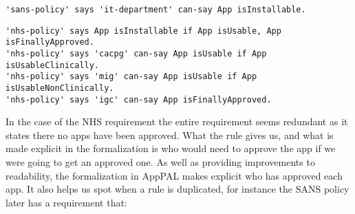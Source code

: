 \documentclass[a4paper]{article}
\newcommand{\dotdotdot}[1]{#1}
\begin{document}
\begin{lstlisting}[title={\footnotesize\textbf{SANS}:~\itshape 
``The IT Department maintains a list of allowed and unauthorised applications and makes them available to users on the intranet.''}]
'sans-policy' says 'it-department' can-say App isInstallable.
\end{lstlisting}
\begin{lstlisting}[title={\footnotesize\textbf{NHS}:~\itshape ``%
Apps for work usage must not be downloaded onto corporately issued mobile devices (even if approved on the NHS apps store) unless they have been approved through the following Trust channels: 
    Clinical apps;
        at the time of writing there are no apps clinically approved by the Trust for use with patients/clients. 
        However, if a member of staff believes that there are clinical apps \dotdotdot{or other technologies that could benefit their patients/clients, this should be discussed with the clinical lead in the first instance and} ratification should be sought via the Care and Clinical Policies Group. 
        \dotdotdot{A clinical app should not be used if it has not been approved via this group.}
    Business apps; 
        at the time of writing there are no business (i.e., non-clinical) apps approved by the Trust for use other than those preloaded onto the device at the point of issue. 
        However, if a member of staff believes that there are apps \dotdotdot{or other technologies that could benefit their non-clinical work,} ratification of the app must be sought via the Management of Information Group (MIG). 
        \dotdotdot{An app should not be used if it has not been approved via this group.}
Following approval through Care and Clinical Policies and/or MIG, final approval will be required through Integrated Governance Committee.''}]
'nhs-policy' says App isInstallable if App isUsable, App isFinallyApproved.
'nhs-policy' says 'cacpg' can-say App isUsable if App isUsableClinically.
'nhs-policy' says 'mig' can-say App isUsable if App isUsableNonClinically.
'nhs-policy' says 'igc' can-say App isFinallyApproved.
\end{lstlisting}

In the case of the NHS requirement the entire requirement seems redundant as it states there no apps have been approved.
What the rule gives us, and what is made explicit in the formalization is who would need to approve the app if we were going to get an approved one.
As well as providing improvements to readability, the formalization in AppPAL makes explicit who has approved each app.
It also helps us spot when a rule is duplicated, for instance the SANS policy later has a requirement that:
\end{document}
